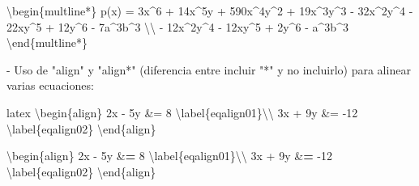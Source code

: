 \documentclass[11pt,a4paper,oneside,]{article}
\newenvironment{Shaded}{\begin{snugshade}}{\end{snugshade}}
\newcommand{\AttributeTok}[1]{\textcolor[rgb]{0.77,0.63,0.00}{#1}}
\newcommand{\DecValTok}[1]{\textcolor[rgb]{0.00,0.00,0.81}{#1}}
\newcommand{\ErrorTok}[1]{\textcolor[rgb]{0.64,0.00,0.00}{\textbf{#1}}}
\newcommand{\FunctionTok}[1]{\textcolor[rgb]{0.00,0.00,0.00}{#1}}
\newcommand{\NormalTok}[1]{#1}
\newcommand{\OtherTok}[1]{\textcolor[rgb]{0.56,0.35,0.01}{#1}}
\newcommand{\SpecialCharTok}[1]{\textcolor[rgb]{0.00,0.00,0.00}{#1}}
\newcommand{\StringTok}[1]{\textcolor[rgb]{0.31,0.60,0.02}{#1}}
\numberwithin{dummy}{section}
\theoremstyle{ocrenumbox}
\theoremstyle{blacknumex}
\theoremstyle{blacknumbox}
\theoremstyle{ocrenum}
\theoremstyle{ocrenum}
\begin{document}
\begin{Shaded}
\begin{Highlighting}[numbers=left,,firstnumber=1101,]
\NormalTok{\textbackslash{}begin\{multline}\SpecialCharTok{*}\NormalTok{\}}
\FunctionTok{p}\NormalTok{(x) }\OtherTok{=}\NormalTok{ 3x}\SpecialCharTok{\^{}}\DecValTok{6} \SpecialCharTok{+}\NormalTok{ 14x}\SpecialCharTok{\^{}}\NormalTok{5y }\SpecialCharTok{+}\NormalTok{ 590x}\SpecialCharTok{\^{}}\NormalTok{4y}\SpecialCharTok{\^{}}\DecValTok{2} \SpecialCharTok{+}\NormalTok{ 19x}\SpecialCharTok{\^{}}\NormalTok{3y}\SpecialCharTok{\^{}}\DecValTok{3} 
            \SpecialCharTok{{-}}\NormalTok{ 32x}\SpecialCharTok{\^{}}\NormalTok{2y}\SpecialCharTok{\^{}}\DecValTok{4} \SpecialCharTok{{-}}\NormalTok{ 22xy}\SpecialCharTok{\^{}}\DecValTok{5} \SpecialCharTok{+}\NormalTok{ 12y}\SpecialCharTok{\^{}}\DecValTok{6} \SpecialCharTok{{-}}\NormalTok{ 7a}\SpecialCharTok{\^{}}\NormalTok{3b}\SpecialCharTok{\^{}}\DecValTok{3}\NormalTok{ \textbackslash{}\textbackslash{} }
\SpecialCharTok{{-}}\NormalTok{ 12x}\SpecialCharTok{\^{}}\NormalTok{2y}\SpecialCharTok{\^{}}\DecValTok{4} \SpecialCharTok{{-}}\NormalTok{ 12xy}\SpecialCharTok{\^{}}\DecValTok{5} \SpecialCharTok{+}\NormalTok{ 2y}\SpecialCharTok{\^{}}\DecValTok{6} \SpecialCharTok{{-}}\NormalTok{ a}\SpecialCharTok{\^{}}\NormalTok{3b}\SpecialCharTok{\^{}}\DecValTok{3}
\NormalTok{\textbackslash{}end\{multline}\SpecialCharTok{*}\NormalTok{\}}


\SpecialCharTok{{-}}\NormalTok{ Uso de }\StringTok{"\textasciigrave{}align\textasciigrave{}"}\NormalTok{ y }\StringTok{"\textasciigrave{}align*\textasciigrave{}"}\NormalTok{ (diferencia entre incluir }\StringTok{"*"}\NormalTok{ y no incluirlo) para alinear varias ecuaciones}\SpecialCharTok{:}

\StringTok{\textasciigrave{}\textasciigrave{}\textasciigrave{}}\AttributeTok{latex}
\SpecialCharTok{\textbackslash{}b}\AttributeTok{egin\{align\} }
\AttributeTok{2x {-} 5y \&=  8  \textbackslash{}label\{eqalign01\}}\SpecialCharTok{\textbackslash{}\textbackslash{}}\AttributeTok{ }
\AttributeTok{3x + 9y \&=  {-}12 \textbackslash{}label\{eqalign02\}}
\SpecialCharTok{\textbackslash{}e}\AttributeTok{nd\{align\}}
\StringTok{\textasciigrave{}\textasciigrave{}\textasciigrave{}}

\NormalTok{\textbackslash{}begin\{align\} }
\NormalTok{2x }\SpecialCharTok{{-}}\NormalTok{ 5y }\SpecialCharTok{\&}\ErrorTok{=}  \DecValTok{8}\NormalTok{  \textbackslash{}label\{eqalign01\}\textbackslash{}\textbackslash{} }
\NormalTok{3x }\SpecialCharTok{+}\NormalTok{ 9y }\SpecialCharTok{\&}\ErrorTok{=}  \SpecialCharTok{{-}}\DecValTok{12}\NormalTok{ \textbackslash{}label\{eqalign02\}}
\NormalTok{\textbackslash{}end\{align\}}


\end{Highlighting}
\end{Shaded}
\end{document}
